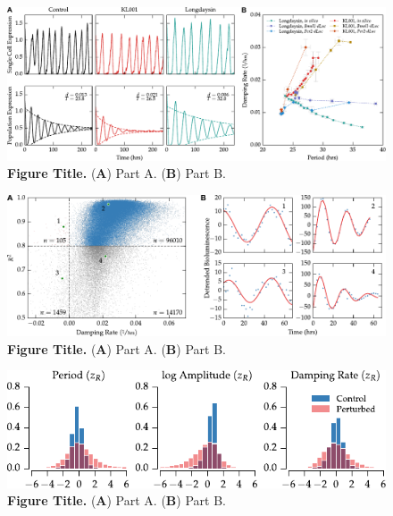 \documentclass[11pt, letterpaper]{article}
\begin{document}
\begin{figure}[tbp]
  \begin{center}
    \includegraphics[]{figures/pdfs/main_fig_simulations.pdf}
  \end{center}
  \caption{{\bfseries Figure Title.}
({\bfseries A}) Part A.
({\bfseries B}) Part B.}
\label{fig:simulation}
\end{figure}


\begin{figure}[tbp]
  \begin{center}
    \includegraphics[]{figures/pdfs/r2_vs_decay.pdf}
  \end{center}
  \caption{{\bfseries Figure Title.}
({\bfseries A}) Part A.
({\bfseries B}) Part B.}
\label{fig:fit_quality}
\end{figure}


\begin{figure}[tbp]
  \begin{center}
    \includegraphics[]{figures/pdfs/fitted_parameters.pdf}
  \end{center}
  \caption{{\bfseries Figure Title.}
({\bfseries A}) Part A.
({\bfseries B}) Part B.}
\label{fig:fit_distributions}
\end{figure}
\end{document}
